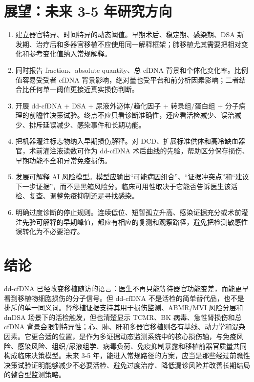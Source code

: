 \documentclass[11pt,a4paper]{article}
\providecommand{\tightlist}{%
  \setlength{\itemsep}{0pt}\setlength{\parskip}{0pt}}
\begin{document}
\section{展望：未来 3-5
年研究方向}\label{ux5c55ux671bux672aux6765-3-5-ux5e74ux7814ux7a76ux65b9ux5411}

\begin{enumerate}
\def\labelenumi{\arabic{enumi}.}
\tightlist
\item
  建立器官特异、时间特异的动态阈值。早期术后、稳定期、感染期、DSA
  新发期、治疗后和多器官移植不应使用同一解释框架；肺移植尤其需要把相对变化和参考变化值纳入常规解释。
\item
  同时报告 fraction、absolute quantity、总 cfDNA 背景和个体化变化率。比例值容易受受者
  cfDNA 背景影响，绝对量也受平台和前分析因素影响；二者结合比任何单一阈值更接近真实损伤判断。
\item
  开展 dd-cfDNA + DSA + 尿液外泌体/趋化因子 + 转录组/蛋白组 +
  分子病理的前瞻性决策试验。终点不应只看诊断准确性，还应看活检减少、误治减少、排斥延误减少、感染事件和长期功能。
\item
  把机器灌注标志物纳入早期损伤解释。对
  DCD、扩展标准供体和高冷缺血器官，术前灌注液读数可作为 dd-cfDNA
  术后曲线的先验，帮助区分保存损伤、早期功能不全和异常免疫损伤。
\item
  发展可解释 AI
  风险模型。模型应输出``可能病因组合''、``证据冲突点''和``建议下一步证据''，而不是黑箱风险分。临床可用性取决于它能否告诉医生该活检、复查、调整免疫抑制还是寻找感染。
\item
  明确过度诊断的停止规则。连续低位、短暂孤立升高、感染证据充分或术前灌注先验可解释的早期峰值，都应有相应的复测和观察路径，避免把检测敏感性误转化为不必要治疗。
\end{enumerate}

\section{结论}\label{ux7ed3ux8bba}

dd-cfDNA
已经改变移植随访的语言：医生不再只能等待器官功能变差，而能更早看到移植物细胞损伤的分子信号。但
dd-cfDNA
不是活检的简单替代品，也不是排斥的单一同义词。肾移植证据支持其用于损伤监测、ABMR/MVI
风险分层和 dnDSA 场景下的活检触发，但也清楚显示 TCMR、BK
病毒、急性肾损伤和总 cfDNA 背景会限制特异性；心、肺、肝和多器官移植则各有基线、动力学和混杂因素。它更合适的位置，是作为多证据动态监测系统中的核心损伤轴，与免疫风险、感染风险、组织/尿液组学、病毒负荷、免疫抑制暴露和移植前器官质量共同构成临床决策模型。未来
3-5
年，能进入常规路径的方案，应当是那些经过前瞻性决策试验证明能够减少不必要活检、避免过度治疗、降低漏诊风险并改善长期结局的整合型监测策略。

\nocite{*}

\end{document}
